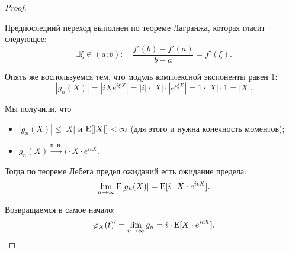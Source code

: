 \begin{proof}
\begin{itemize}
        Предпоследний переход выполнен по теореме Лагранжа, которая гласит следующее:
        \begin{equation*}
            \exists \xi \in (a; b): \quad \dfrac{f'(b) - f'(a)}{b - a} = f'(\xi).
        \end{equation*}

        Опять же воспользуемся тем, что модуль комплексной экспоненты равен $1$:
        \begin{equation*}
            |g_n(X)| 
            = \left|iX e^{i \xi X}\right|
            = |i| \cdot |X| \cdot \left|e^{i \xi X}\right|
            = 1 \cdot |X| \cdot 1
            = |X|.
        \end{equation*}
    \end{itemize}

    Мы получили, что
    \begin{itemize}
    \item 
        $|g_n(X)| \leq |X|$ и $\operatorname{E}[|X|] < \infty$ (для этого и нужна конечность моментов);

    \item 
        $g_n(X) \xrightarrow{\text{п. н.}} i \cdot X \cdot e^{itX}$.
    \end{itemize}

    Тогда по теореме Лебега предел ожиданий есть ожидание предела:
    \begin{equation*}
        \lim_{n \to \infty} \operatorname{E}[g_n(X)] = \operatorname{E}[i \cdot X \cdot e^{itX}].
    \end{equation*}

    Возвращаемся в самое начало:
    \begin{equation*}
        \varphi_X(t)' = \lim_{n \to \infty} g_n = i \cdot \operatorname{E}[X \cdot e^{itX}].
    \end{equation*}
\end{proof} 